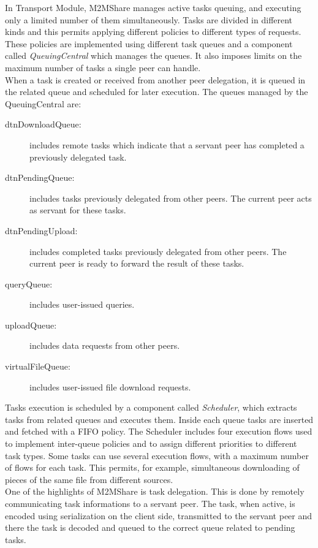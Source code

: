 In Transport Module, M2MShare manages active tasks queuing, and executing only a limited number of them simultaneously. Tasks are divided in different kinds and this permits applying different policies to different types of requests. These policies are implemented using different task queues and a component called \textit{QueuingCentral} which manages the queues. It also imposes limits on the maximum number of tasks a single peer can handle.
\\

When a task is created or received from another peer delegation, it is queued in the related queue and scheduled for later execution. The queues managed by the QueuingCentral are:
\begin{description}
\item[dtnDownloadQueue:] includes remote tasks which indicate that a servant peer has completed a previously delegated task.
\item[dtnPendingQueue:] includes tasks previously delegated from other peers. The current peer acts as servant for these tasks.
\item[dtnPendingUpload:] includes completed tasks previously delegated from other peers. The current peer is ready to forward the result of these tasks.
\item[queryQueue:] includes user-issued queries.
\item[uploadQueue:] includes data requests from other peers.
\item[virtualFileQueue:] includes user-issued file download requests.
\end{description}

Tasks execution is scheduled by a component called \textit{Scheduler}, which extracts tasks from related queues and executes them. Inside each queue tasks are inserted and fetched with a FIFO policy. The Scheduler includes four execution flows used to implement inter-queue policies and to assign different priorities to different task types. Some tasks can use several execution flows, with a maximum number of flows for each task. This permits, for example, simultaneous downloading of pieces of the same file from different sources.
\\

One of the highlights of M2MShare is task delegation. This is done by remotely communicating task informations to a servant peer. The task, when active, is encoded using serialization on the client side, transmitted to the servant peer and there the task is decoded and queued to the correct queue related to pending tasks.

